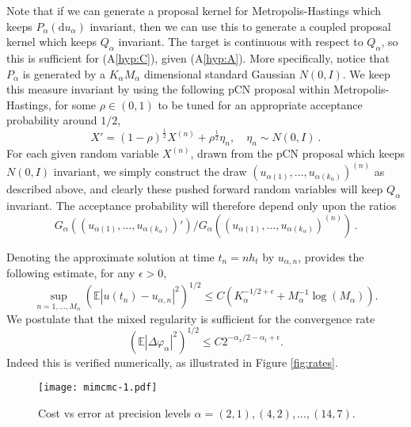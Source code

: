 \documentclass[english]{article}
\newcommand{\dif}{\mathrm{d}}
\newcommand{\bbE}{\mathbb{E}}
\begin{document}
Note that if we can generate a proposal kernel for Metropolis-Hastings 
which keeps %
$P_\alpha(\dif u_\alpha)$ invariant, then we can use this to generate a coupled 
proposal kernel which keeps $Q_{\alpha}$ invariant.
The target is continuous with respect to $Q_{\alpha}$,
so this is sufficient for (A\ref{hyp:C}), given (A\ref{hyp:A}).
More specifically, notice that $P_\alpha$ is generated by a $K_\alpha M_\alpha$
dimensional standard Gaussian $N(0,I)$.
We keep this measure invariant by using the following pCN proposal 
\cite{beskos1} within Metropolis-Hastings, 
for some $\rho\in (0,1)$ to be tuned for an appropriate acceptance probability around $1/2$,
$$
X' = (1-\rho)^\frac12 X^{(n)} + \rho^\frac12 \eta_n, \quad \eta_n\sim N(0,I) \ .
$$
For each given random variable $X^{(n)}$, drawn from the pCN
proposal which keeps $N(0,I)$ invariant, we simply construct the draw 
$(u_{\alpha(1)},\dots,u_{\alpha(k_\alpha)})^{(n)}$ as described 
above, and clearly these pushed forward random variables 
will keep $Q_{\alpha}$ invariant.  
The acceptance probability will therefore depend only upon the ratios
$$
G_\alpha((u_{\alpha(1)},\dots, u_{\alpha(k_\alpha)})')/
G_\alpha((u_{\alpha(1)},\dots, u_{\alpha(k_\alpha)})^{(n)}) \, .$$


Denoting the approximate solution at time $t_n=n h_t$
by $u_{\alpha,n}$, \cite{spde_disc} provides the following estimate, for any $\epsilon>0$,
\begin{equation}\label{eq:errorest}
\sup_{n=1,\dots, M_\alpha} \left( \bbE |u(t_n) - u_{\alpha,n}|^2 \right)^{1/2} 
\leq C (K_\alpha^{-1/2 +\epsilon} + M_\alpha^{-1}\log(M_\alpha)).
\end{equation}
We postulate that the mixed regularity is sufficient for the convergence rate 
$$
\left( \bbE |\Delta \varphi_\alpha|^2 \right)^{1/2} \leq 
C 2^{-\alpha_x/2 - \alpha_t + \epsilon}.
$$
Indeed this is verified numerically, as illustrated in Figure \ref{fig:rates}.


\begin{figure}
  \texttt{[image: mimcmc-1.pdf]}
  \caption{Cost vs error at precision levels $\alpha = (2, 1), (4, 2), \dots,
  (14, 7)$.}
  \label{fig:cost}
\end{figure}
 
\end{document}
